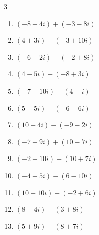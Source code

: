 \begin{multicols}{3}
\begin{enumerate}
  \item $\displaystyle (-8-4i) + (-3-8i)$

        \phantom{$\displaystyle =-11-12i$}

  \item $\displaystyle (4+3i) + (-3+10i)$

        \phantom{$\displaystyle =1+13i$}

  \item $\displaystyle (-6+2i) - (-2+8i)$

        \phantom{$\displaystyle =-4-6i$}

  \item $\displaystyle (4-5i) - (-8+3i)$

        \phantom{$\displaystyle =12-8i$}

  \item $\displaystyle (-7-10i) + (4-i)$

        \phantom{$\displaystyle =-3-11i$}

\columnbreak %

  \item $\displaystyle (5-5i) - (-6-6i)$

        \phantom{$\displaystyle =11+i$}

  \item $\displaystyle (10+4i) - (-9-2i)$

        \phantom{$\displaystyle =19+6i$}

  \item $\displaystyle (-7-9i) + (10-7i)$

        \phantom{$\displaystyle =3-16i$}

  \item $\displaystyle (-2-10i) - (10+7i)$

        \phantom{$\displaystyle =-12-17i$}

  \item $\displaystyle (-4+5i) - (6-10i)$

        \phantom{$\displaystyle =-10+15i$}

  \item $\displaystyle (10-10i) + (-2+6i)$

        \phantom{$\displaystyle =8-4i$}

  \item $\displaystyle (8-4i) - (3+8i)$

        \phantom{$\displaystyle =5-12i$}

  \item $\displaystyle (5+9i) - (8+7i)$


\end{enumerate}
\end{multicols}
